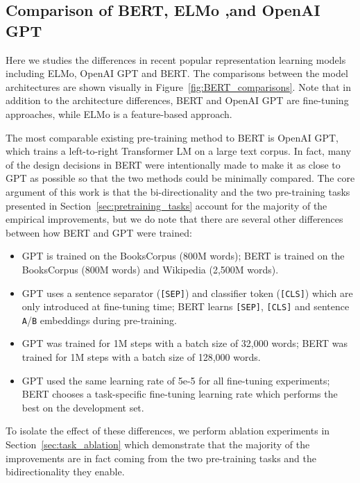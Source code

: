 \subsection{Comparison of BERT, ELMo ,and OpenAI GPT}
\label{appendix:sec:comparing_bert_and_openai}

Here we studies the differences in recent popular representation learning
models including ELMo, OpenAI GPT and BERT.
The comparisons between the model
architectures are shown visually in Figure~\ref{fig:BERT_comparisons}. Note that
in addition to the architecture differences, BERT and OpenAI GPT are fine-tuning approaches, while ELMo is a feature-based approach.

The most comparable existing pre-training method to BERT is OpenAI GPT, which trains a left-to-right Transformer LM on a large text corpus. 
In fact, many of the design decisions in BERT were intentionally made to make it as close to GPT as possible so that the two methods could be minimally compared.
The core argument of this work is that the bi-directionality and the two pre-training tasks presented in Section~\ref{sec:pretraining_tasks} account for the majority of the empirical improvements, but we do note that there are several other differences between how BERT and GPT were trained:

\begin{itemize}
\item GPT is trained on the BooksCorpus (800M words); BERT is trained on the BooksCorpus (800M words) and Wikipedia (2,500M words).
\item GPT uses a sentence separator ({\tt [SEP]}) and classifier token ({\tt [CLS]}) which are only introduced at fine-tuning time; BERT learns {\tt [SEP]}, {\tt [CLS]} and sentence {\tt A}/{\tt B} embeddings during pre-training.
\item GPT was trained for 1M steps with a batch size of 32,000 words; BERT was trained for 1M steps with a batch size of 128,000 words.
\item GPT used the same learning rate of 5e-5 for all fine-tuning experiments; BERT chooses a task-specific fine-tuning learning rate which performs the best on the development set.
\end{itemize}

To isolate the effect of these differences, we perform ablation experiments in Section~\ref{sec:task_ablation} which demonstrate that the majority of the improvements are in fact coming from the two pre-training tasks and the bidirectionality they enable.



